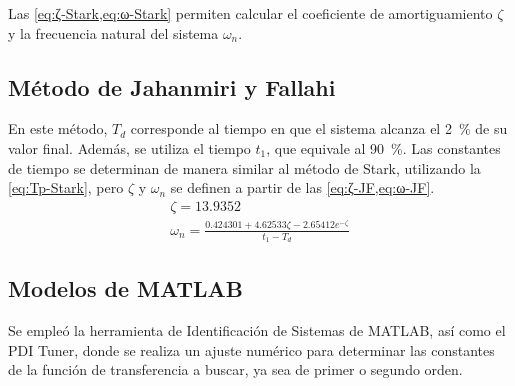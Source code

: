 Las \cref{eq:ζ-Stark,eq:ω-Stark} permiten calcular el coeficiente de
amortiguamiento \(\zeta\) y la frecuencia natural del sistema \(\omega_n\).

\subsection{Método de Jahanmiri y Fallahi}

En este método, \(T_d\) corresponde al tiempo en que el sistema alcanza
el \qty{2}{\percent} de su valor final. Además, se utiliza el tiempo \(t_1\),
que equivale al \qty{90}{\percent}. Las constantes de tiempo se determinan
de manera similar al método de Stark, utilizando la \cref{eq:Tp-Stark},
pero \(\zeta\) y \(\omega_n\) se definen a partir de las \cref{eq:ζ-JF,eq:ω-JF}.
\cite{jahanmiri-1997}
\begin{gather}
  \zeta = 13.9352 \label{eq:ζ-JF} \\
  \omega_n = \frac{0.424301 + 4.62533 \zeta - 2.65412 e^{-\zeta}}{t_1 - T_d} \label{eq:ω-JF}
\end{gather}

\subsection{Modelos de MATLAB}

Se empleó la herramienta de Identificación de Sistemas de MATLAB, así como el
PDI Tuner, donde se realiza un ajuste numérico para determinar las constantes
de la función de transferencia a buscar, ya sea de primer o segundo orden.
